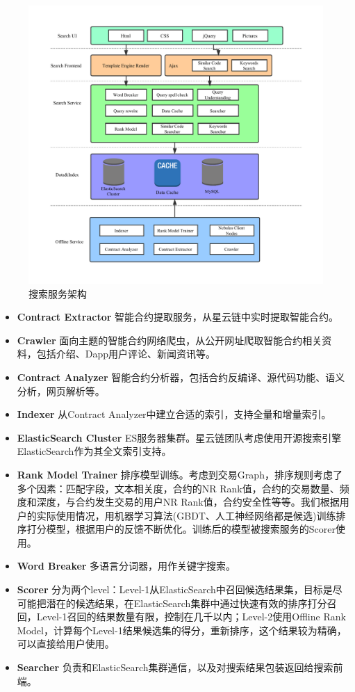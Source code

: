 \begin{figure}[h]
\centering
\includegraphics[width=16cm]{./figs/search-arch.pdf}
\caption{搜索服务架构}
\label{fig:search-arch}
\end{figure}

\begin{itemize}
	\item \textbf{Contract Extractor} 智能合约提取服务，从星云链中实时提取智能合约。
	\item \textbf{Crawler} 面向主题的智能合约网络爬虫，从公开网址爬取智能合约相关资料，包括介绍、Dapp用户评论、新闻资讯等。
	\item \textbf{Contract Analyzer} 智能合约分析器，包括合约反编译、源代码功能、语义分析，网页解析等。
	\item \textbf{Indexer} 从Contract Analyzer中建立合适的索引，支持全量和增量索引。
	\item \textbf{ElasticSearch Cluster} ES服务器集群。星云链团队考虑使用开源搜索引擎ElasticSearch作为其全文索引支持。
	\item \textbf{Rank Model Trainer} 排序模型训练。考虑到交易Graph，排序规则考虑了多个因素：匹配字段，文本相关度，合约的NR Rank值，合约的交易数量、频度和深度，与合约发生交易的用户NR Rank值，合约安全性等等。我们根据用户的实际使用情况，用机器学习算法(GBDT、人工神经网络都是候选)训练排序打分模型，根据用户的反馈不断优化。训练后的模型被搜索服务的Scorer使用。
	\item \textbf{Word Breaker} 多语言分词器，用作关键字搜索。
	\item \textbf{Scorer} 分为两个level：Level-1从ElasticSearch中召回候选结果集，目标是尽可能把潜在的候选结果，在ElasticSearch集群中通过快速有效的排序打分召回，Level-1召回的结果数量有限，控制在几千以内；Level-2使用Offline Rank Model，计算每个Level-1结果候选集的得分，重新排序，这个结果较为精确，可以直接给用户使用。
	\item \textbf{Searcher} 负责和ElasticSearch集群通信，以及对搜索结果包装返回给搜索前端。
\end{itemize}

